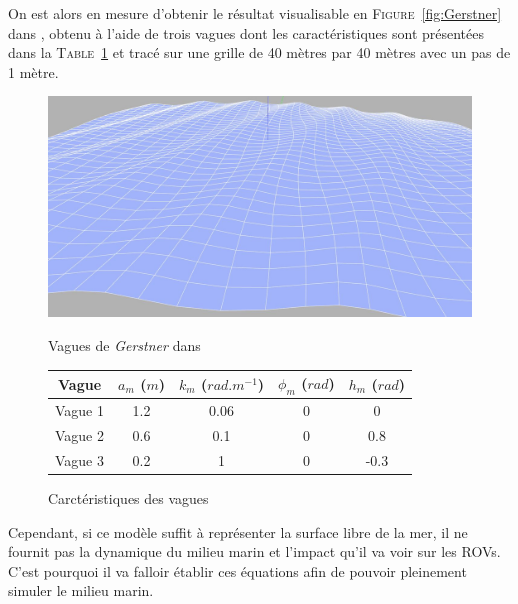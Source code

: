 				On est alors en mesure d'obtenir le résultat visualisable en \textsc{Figure}~\ref{fig:Gerstner} dans \gazebo{}, obtenu à l'aide de trois vagues dont les caractéristiques sont présentées dans la \textsc{Table}~\ref{table:wave} et tracé sur une grille de 40 mètres par 40 mètres avec un pas de 1 mètre.

				\begin{figure}[!htb]
					\begin{minipage}[c]{0.45\textwidth}
						\centering
						\includegraphics[width=\textwidth]{imgs/gerstner.jpg}
						\caption{Vagues de \textit{Gerstner} dans \gazebo{}}
						\label{fig:Gerstner}
					\end{minipage} \hfill
					\begin{minipage}[c]{0.55\textwidth}
						\begin{adjustbox}{max width=\textwidth}
							\begin{tabular}{c c c c c}
								\toprule
								\textbf{Vague} & $a_m$ ($m$) & $k_m$ ($rad.m^{-1}$) & $\phi_m$ ($rad$) & $h_m$ ($rad$) \\
								\midrule
								Vague 1 & 1.2 & 0.06 & 0 & 0 \\
								Vague 2 & 0.6 & 0.1 & 0 & 0.8 \\
								Vague 3 & 0.2 & 1 & 0 & -0.3 \\
								\bottomrule
							\end{tabular}
						\end{adjustbox}
						\caption{Carctéristiques des vagues}
						\label{table:wave}
					\end{minipage}
				\end{figure}

				Cependant, si ce modèle suffit à représenter la surface libre de la mer, il ne fournit pas la dynamique du milieu marin et l'impact qu'il va voir sur les \gls{ROV}s. C'est pourquoi il va falloir établir ces équations afin de pouvoir pleinement simuler le milieu marin.
				
